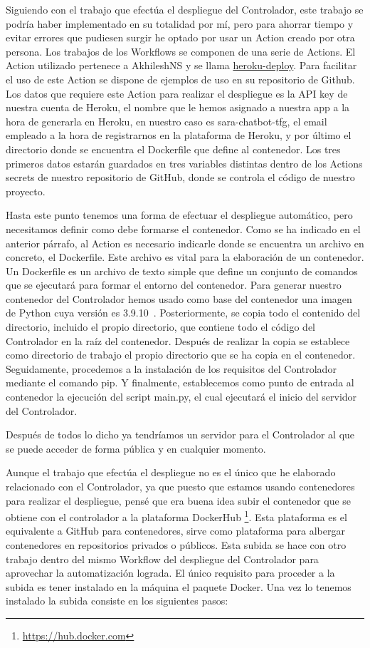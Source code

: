 Siguiendo con el trabajo que efectúa el despliegue del Controlador, este trabajo se podría haber implementado en su totalidad por mí, pero para ahorrar tiempo y evitar errores que pudiesen surgir he optado por usar un Action creado por otra persona. Los trabajos de los Workflows se componen de una serie de Actions. El Action utilizado pertenece a AkhileshNS y se llama \href{https://github.com/AkhileshNS/heroku-deploy}{heroku-deploy}. Para facilitar el uso de este Action se dispone de ejemplos de uso en su repositorio de Github. Los datos que requiere este Action para realizar el despliegue es la API key de nuestra cuenta de Heroku, el nombre que le hemos asignado a nuestra app a la hora de generarla en Heroku, en nuestro caso es sara-chatbot-tfg, el email empleado a la hora de registrarnos en la plataforma de Heroku, y por último el directorio donde se encuentra el Dockerfile que define al contenedor. Los tres primeros datos estarán guardados en tres variables distintas dentro de los Actions secrets de nuestro repositorio de GitHub, donde se controla el código de nuestro proyecto.

Hasta este punto tenemos una forma de efectuar el despliegue automático, pero necesitamos definir como debe formarse el contenedor. Como se ha indicado en el anterior párrafo, al Action es necesario indicarle donde se encuentra un archivo en concreto, el Dockerfile. Este archivo es vital para la elaboración de un contenedor. Un Dockerfile es un archivo de texto simple que define un conjunto de comandos que se ejecutará para formar el entorno del contenedor. Para generar nuestro contenedor del Controlador hemos usado como base del contenedor una imagen de Python cuya versión es 3.9.10\ . Posteriormente, se copia todo el contenido del directorio, incluido el propio directorio, que contiene todo el código del Controlador en la raíz del contenedor. Después de realizar la copia se establece como directorio de trabajo el propio directorio que se ha copia en el contenedor. Seguidamente, procedemos a la instalación de los requisitos del Controlador mediante el comando pip. Y finalmente, establecemos como punto de entrada al contenedor la ejecución del script main.py, el cual ejecutará el inicio del servidor del Controlador.

Después de todos lo dicho ya tendríamos un servidor para el Controlador al que se puede acceder de forma pública y en cualquier momento.

Aunque el trabajo que efectúa el despliegue no es el único que he elaborado relacionado con el Controlador, ya que puesto que estamos usando contenedores para realizar el despliegue, pensé que era buena idea subir el contenedor que se obtiene con el controlador a la plataforma DockerHub \footnote{\url{https://hub.docker.com}}. Esta plataforma es el equivalente a GitHub para contenedores, sirve como plataforma para albergar contenedores en repositorios privados o públicos. Esta subida se hace con otro trabajo dentro del mismo Workflow del despliegue del Controlador para aprovechar la automatización lograda. El único requisito para proceder a la subida es tener instalado en la máquina el paquete Docker. Una vez lo tenemos instalado la subida consiste en los siguientes pasos:

